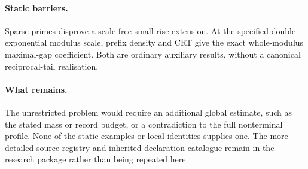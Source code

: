 \paragraph{Static barriers.}
Sparse primes disprove a scale-free small-rise extension. At the specified
double-exponential modulus scale, prefix density and CRT give the exact
whole-modulus maximal-gap coefficient. Both are ordinary auxiliary results,
without a canonical reciprocal-tail realisation.

\paragraph{What remains.}
The unrestricted problem would require an additional global estimate, such
as the stated mass or record budget, or a contradiction to the full
nonterminal profile. None of the static examples or local identities
supplies one. The more detailed source registry and inherited declaration
catalogue remain in the research package rather than being repeated here.

